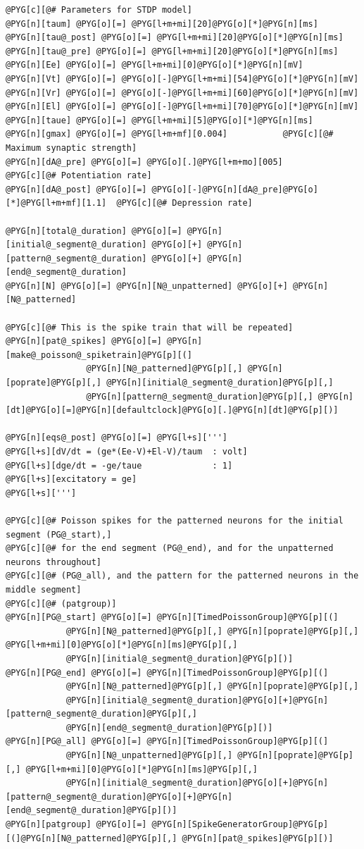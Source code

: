 \documentclass[letterpaper,10pt,english]{manual}
\begin{document}
\begin{Verbatim}[commandchars=@\[\]]
@PYG[c][@# Parameters for STDP model]
@PYG[n][taum] @PYG[o][=] @PYG[l+m+mi][20]@PYG[o][*]@PYG[n][ms]
@PYG[n][tau@_post] @PYG[o][=] @PYG[l+m+mi][20]@PYG[o][*]@PYG[n][ms]
@PYG[n][tau@_pre] @PYG[o][=] @PYG[l+m+mi][20]@PYG[o][*]@PYG[n][ms]
@PYG[n][Ee] @PYG[o][=] @PYG[l+m+mi][0]@PYG[o][*]@PYG[n][mV]
@PYG[n][Vt] @PYG[o][=] @PYG[o][-]@PYG[l+m+mi][54]@PYG[o][*]@PYG[n][mV]
@PYG[n][Vr] @PYG[o][=] @PYG[o][-]@PYG[l+m+mi][60]@PYG[o][*]@PYG[n][mV]
@PYG[n][El] @PYG[o][=] @PYG[o][-]@PYG[l+m+mi][70]@PYG[o][*]@PYG[n][mV]
@PYG[n][taue] @PYG[o][=] @PYG[l+m+mi][5]@PYG[o][*]@PYG[n][ms]
@PYG[n][gmax] @PYG[o][=] @PYG[l+m+mf][0.004]           @PYG[c][@# Maximum synaptic strength]
@PYG[n][dA@_pre] @PYG[o][=] @PYG[o][.]@PYG[l+m+mo][005]          @PYG[c][@# Potentiation rate]
@PYG[n][dA@_post] @PYG[o][=] @PYG[o][-]@PYG[n][dA@_pre]@PYG[o][*]@PYG[l+m+mf][1.1]  @PYG[c][@# Depression rate]

@PYG[n][total@_duration] @PYG[o][=] @PYG[n][initial@_segment@_duration] @PYG[o][+] @PYG[n][pattern@_segment@_duration] @PYG[o][+] @PYG[n][end@_segment@_duration]
@PYG[n][N] @PYG[o][=] @PYG[n][N@_unpatterned] @PYG[o][+] @PYG[n][N@_patterned]

@PYG[c][@# This is the spike train that will be repeated]
@PYG[n][pat@_spikes] @PYG[o][=] @PYG[n][make@_poisson@_spiketrain]@PYG[p][(]
                @PYG[n][N@_patterned]@PYG[p][,] @PYG[n][poprate]@PYG[p][,] @PYG[n][initial@_segment@_duration]@PYG[p][,]
                @PYG[n][pattern@_segment@_duration]@PYG[p][,] @PYG[n][dt]@PYG[o][=]@PYG[n][defaultclock]@PYG[o][.]@PYG[n][dt]@PYG[p][)]

@PYG[n][eqs@_post] @PYG[o][=] @PYG[l+s][''']
@PYG[l+s][dV/dt = (ge*(Ee-V)+El-V)/taum  : volt]
@PYG[l+s][dge/dt = -ge/taue              : 1]
@PYG[l+s][excitatory = ge]
@PYG[l+s][''']

@PYG[c][@# Poisson spikes for the patterned neurons for the initial segment (PG@_start),]
@PYG[c][@# for the end segment (PG@_end), and for the unpatterned neurons throughout]
@PYG[c][@# (PG@_all), and the pattern for the patterned neurons in the middle segment]
@PYG[c][@# (patgroup)]
@PYG[n][PG@_start] @PYG[o][=] @PYG[n][TimedPoissonGroup]@PYG[p][(]
            @PYG[n][N@_patterned]@PYG[p][,] @PYG[n][poprate]@PYG[p][,] @PYG[l+m+mi][0]@PYG[o][*]@PYG[n][ms]@PYG[p][,]
            @PYG[n][initial@_segment@_duration]@PYG[p][)]
@PYG[n][PG@_end] @PYG[o][=] @PYG[n][TimedPoissonGroup]@PYG[p][(]
            @PYG[n][N@_patterned]@PYG[p][,] @PYG[n][poprate]@PYG[p][,]
            @PYG[n][initial@_segment@_duration]@PYG[o][+]@PYG[n][pattern@_segment@_duration]@PYG[p][,]
            @PYG[n][end@_segment@_duration]@PYG[p][)]
@PYG[n][PG@_all] @PYG[o][=] @PYG[n][TimedPoissonGroup]@PYG[p][(]
            @PYG[n][N@_unpatterned]@PYG[p][,] @PYG[n][poprate]@PYG[p][,] @PYG[l+m+mi][0]@PYG[o][*]@PYG[n][ms]@PYG[p][,]
            @PYG[n][initial@_segment@_duration]@PYG[o][+]@PYG[n][pattern@_segment@_duration]@PYG[o][+]@PYG[n][end@_segment@_duration]@PYG[p][)]
@PYG[n][patgroup] @PYG[o][=] @PYG[n][SpikeGeneratorGroup]@PYG[p][(]@PYG[n][N@_patterned]@PYG[p][,] @PYG[n][pat@_spikes]@PYG[p][)]


\end{Verbatim}
\end{document}
